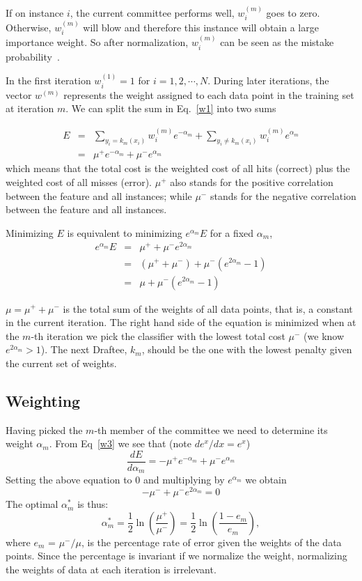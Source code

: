 \documentclass[]{article}  %
\begin{document}
If on instance $i$, the current committee performs well, $w_i^{(m)}$ goes to zero. Otherwise, $w_i^{(m)}$ will blow and therefore this instance will obtain a large importance weight. So after normalization, $w_i^{(m)}$ can be seen as the mistake probability~\cite{sibyl}. 

In the first iteration $w_i^{(1)} = 1 $ for $i=1,2,\cdots, N$. During later iterations, the vector $w^{(m)}$ represents the weight assigned to each data point in the training set at iteration $m$. We can split the sum in Eq.~\ref{w1} into two sums

\begin{eqnarray}
E &=& \sum _{y_i = k_m(x_i)} w_i^{(m)} e^{-\alpha_m} +  \sum _{y_i \neq k_m(x_i)} w_i^{(m)} e^{\alpha_m} \\
 & =& \mu^+ e^{-\alpha_m} + \mu^- e^{\alpha_m} \label{w3}
\end{eqnarray}
which means that the total cost is the weighted cost of all hits (correct) plus the weighted cost of all misses (error). $\mu^+$ also stands for the positive correlation between the feature and all instances; while $\mu^-$ stands for the negative correlation between the feature and all instances.

Minimizing $E$ is equivalent to minimizing $e^{\alpha_m}E$ for a fixed $\alpha_m$,
\begin{eqnarray}
e^{\alpha_m}E &= & \mu^+ + \mu^- e^{2\alpha_m}\\
 & = & (\mu^+ + \mu^-) + \mu^- ( e^{2\alpha_m} -1)\\
 & = & \mu + \mu^- ( e^{2\alpha_m} -1)
\end{eqnarray}

$\mu=\mu^+ + \mu^-$ is the total sum of the weights of all data points, that is, a constant in the current iteration. The right hand side of the equation is minimized when at the $m$-th iteration we pick the classifier with the lowest total cost $\mu^-$ (we know $e^{2\alpha_m} > 1$). The next Draftee, $k_m$, should be the one with the lowest penalty given the current set of weights.

\subsection{Weighting}

Having picked the $m$-th member of the committee we need to determine its weight $\alpha_m$. From Eq~\ref{w3} we see that (note $de^x/dx = e^x$)
\[
\frac {dE}{d\alpha_m} = -\mu^+e^{-\alpha_m} + \mu^- e^{\alpha_m}
\]
Setting the above equation to 0 and multiplying by $e^{\alpha_m}$ we obtain
\[
-\mu^- + \mu^- e ^{2\alpha_m} = 0
\]
The optimal $\alpha_m^*$ is thus:
\[
\alpha_m^* = \frac{1}{2} \ln \left(\frac{\mu^+}{\mu^-}\right) = \frac{1}{2} \ln \left(\frac{1-e_m}{e_m}\right) ,
\]
where $e_m$ = $\mu^-/\mu$, is the percentage rate of error given the weights of the data points. Since the percentage is invariant if we normalize the weight, normalizing the weights of data at each iteration is irrelevant.
\end{document}
